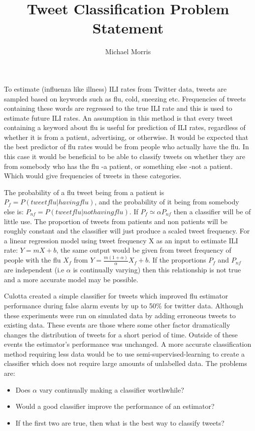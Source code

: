 \documentclass[a4paper]{article}
\title{Tweet Classification Problem Statement}
\author{Michael Morris}
\begin{document}
\maketitle
To estimate (influenza like illness) ILI rates from Twitter data, tweets are sampled based on keywords such as flu, cold, sneezing etc. Frequencies of tweets containing these words are regressed to the true ILI rate and this is used to estimate future ILI rates. 
An assumption in this method is that every tweet containing a keyword about flu is useful for prediction of ILI rates, regardless of whether it is from a patient, advertising, or otherwise.
It would be expected that the best predictor of flu rates would be from people who actually have the flu. In this case it would be beneficial to be able to classify tweets on whether they are from somebody who has the flu -a patient, or something else -not a patient. Which would give frequencies of tweets in these categories. 

The probability of a flu tweet being from a patient is $P_f = P(tweet flu|having flu)$, and the probability of it being from somebody else is: $P_{nf} = P(tweet flu | not having flu)$. If $P_f\simeq \alpha P_{nf}$ then a classifier will be of little use.  The proportion of tweets from patients and non patients will be roughly constant and the classifier will just produce a scaled tweet frequency.
For a linear regression model using tweet frequency X as an input to estimate ILI rate: $Y=mX+b$, the same output would be given from tweet frequency of people with the flu $X_f$ from $Y= \frac{m(1+\alpha)}{\alpha}X_f+b$. If the proportions $P_f$ and $P_{nf}$ are independent (i.e $\alpha$ is continually varying) then this relationship is not true and a more accurate model may be possible.

Culotta \cite{Culotta} created a simple classifier for tweets which improved flu estimator performance during false alarm events by up to 50\% for twitter data. Although these experiments were run on simulated data by adding erroneous tweets to existing data. These events are those where some other factor dramatically changes the distribution of tweets for a short period of time. Outside of these events the estimator's performance was unchanged. A more accurate classification method requiring less data would be to use semi-supervised-learning to create a classifier which does not require large amounts of unlabelled data. The problems are: 
\begin{itemize}
\item Does $\alpha$ vary continually making a classifier worthwhile? 
\item Would a good classifier improve the performance of an estimator?
\item If the first two are true, then what is the best way to classify tweets?
\end{itemize}
 {}

\end{document}
